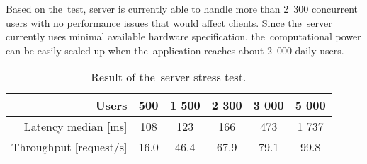 Based on the~test, server is currently able to handle more than 2~300 concurrent users with no performance issues that would affect clients. Since the~server currently uses minimal available hardware specification, the~computational power can be easily scaled up when the~application reaches about 2~000 daily users.

\begin{table}
	\centering
	\begin{tabular}{r || c | c | c | c | c |}
		Users & 500 & 1 500 & 2 300 & 3 000 & 5 000 \\ \hline 
		Latency median [ms] & 108 & 123 & 166 & 473 & 1 737 \\
		Throughput [request/s] & 16.0 & 46.4 & 67.9 & 79.1 & 99.8 \\
	\end{tabular}
	\caption{Result of the~server stress test.}
	\label{tab:loadtestresults}
\end{table}	

